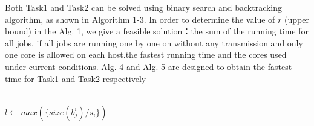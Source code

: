 \documentclass{llncs}
\begin{document}
Both Task1 and Task2 can be solved using binary search and backtracking algorithm, as shown in Algorithm 1-3. In order to determine the value of $r$ (upper bound) in the Alg. 1, we give a feasible solution：the sum of the running time for all jobs, if all jobs are running one by one on without any transmission and only one core is allowed on each host.the fastest running time and the cores used under current conditions. Alg. 4 and Alg. 5 are designed to obtain the fastest time for Task1 and Task2 respectively \\
\\
\begin{algorithm}[H]
    \BlankLine
    \caption{$Binary Search + Backtracking$}
    $l \leftarrow max(\{size(b^i_j) / s_i\})$\\
    \\
    \;
\end{algorithm}

\begin{algorithm}[H]
    \BlankLine
    \caption{$check$}
    \\
\end{algorithm}
\end{document}
